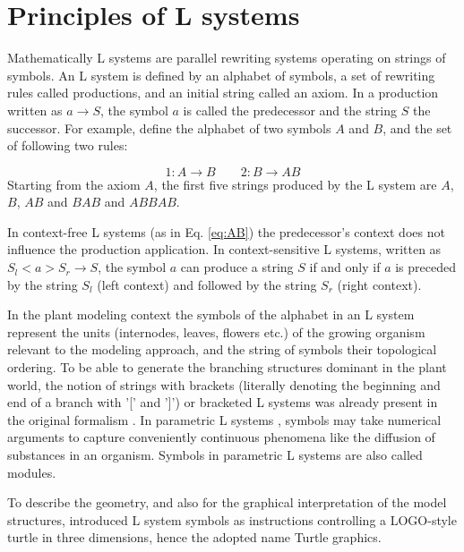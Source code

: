 \section{Principles of L systems}

Mathematically L  systems are parallel rewriting  systems operating on
strings of symbols. An L system  is defined by an alphabet of symbols,
a set  of rewriting  rules called productions,  and an  initial string
called an  axiom. In  a production written  as $a \rightarrow  S$, the
symbol $a$ is called the predecessor and the string $S$ the successor.
For example, define  the alphabet of two symbols $A$  and $B$, and the
set of following two rules:

\begin{equation}\label{eq:AB}
1: A \rightarrow B \qquad 2: B \rightarrow AB 
\end{equation}
Starting from the axiom $A$, the  first five strings produced by the L
system are $A$, $B$, $AB$ and $BAB$ and $ABBAB$.

In context-free  L systems (as in Eq.   \ref{eq:AB}) the predecessor's
context   does   not  influence   the   production  application.    In
context-sensitive L systems, written as $S_l < a > S_r \rightarrow S$,
the symbol $a$ can produce a string $S$ if and only if $a$ is preceded
by the  string $S_l$ (left context)  and followed by  the string $S_r$
(right context).

In the  plant modeling  context the  symbols of the  alphabet in  an L
system represent the units  (internodes, leaves, flowers etc.)  of the
growing organism relevant to the  modeling approach, and the string of
symbols  their  topological ordering.   To  be  able  to generate  the
branching  structures  dominant in  the  plant  world,  the notion  of
strings with brackets  (literally denoting the beginning and  end of a
branch with '[' and ']') or bracketed L systems was already present in
the  original  formalism   \citep{lindenmayer:68}.   In  parametric  L
systems  \citep{pp:90a},  symbols  may  take  numerical  arguments  to
capture  conveniently  continuous  phenomena  like  the  diffusion  of
substances in an  organism.  Symbols in parametric L  systems are also
called modules.  

To describe the geometry, and also for the graphical interpretation of
the  model structures,  \citet{pp:86} introduced  L system  symbols as
instructions  controlling a  LOGO-style  turtle \citep{abelson:82}  in
three dimensions, hence the adopted name Turtle graphics.


